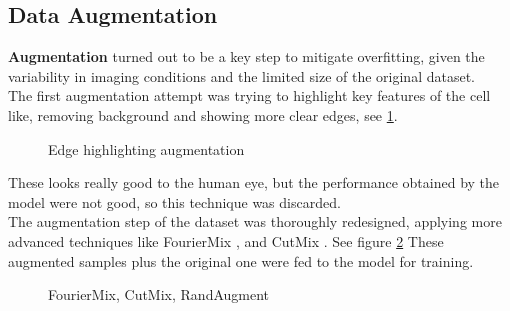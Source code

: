 \documentclass[11pt]{article}
\begin{document}
\begin{multicols}{2}
        \subsection{Data Augmentation}
        \label{sec:aug}
        \textbf{Augmentation} turned out to be a key step to mitigate overfitting, given the variability in imaging conditions and the limited size of the original dataset.\\
        The first augmentation attempt was trying to highlight key features of the cell like, removing background and showing more clear edges, see \ref{fig:edge}.
        \begin{figure}[H]
        \centering
        \caption{Edge highlighting augmentation}
        \label{fig:edge}
        \end{figure}
        These looks really good to the human eye, but the performance obtained by the model were not good, so this technique was discarded. \\
        The augmentation step of the dataset was thoroughly redesigned, applying more advanced techniques like FourierMix \cite{fouriermix}, and CutMix \cite{cutmix}. See figure \ref{fig:final_aug}
        These augmented samples plus the original one were fed to the model for training. 
        \begin{figure}[H]
        \centering
        \caption{FourierMix, CutMix, RandAugment}
        \label{fig:final_aug}
        \end{figure}
        

\end{multicols}
\end{document}

